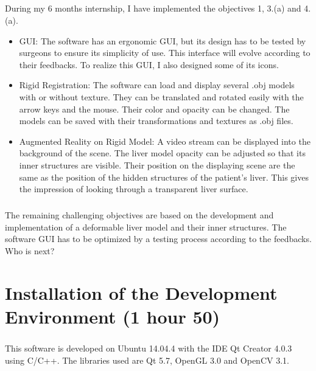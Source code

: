 \documentclass[12pt]{report}
\begin{document}
\paragraph{}
	During my 6 months internship, I have implemented the objectives 1, 3.(a) and 4.(a).\begin{itemize}
\item GUI: The software has an ergonomic GUI, but its design has to be tested by surgeons to ensure its simplicity of use. This interface will evolve according to their feedbacks. To realize this GUI, I also designed some of its icons.

\item Rigid Registration: The software can load and display several .obj models with or without texture. They can be translated and rotated easily with the arrow keys and the mouse. Their color and opacity can be changed. The models can be saved with their transformations and textures as .obj files.

\item Augmented Reality on Rigid Model: A video stream can be displayed into the background of the scene. The liver model opacity can be adjusted so that its inner structures are visible. Their position on the displaying scene are the same as the position of the hidden structures of the patient's liver. This gives the impression of looking through a transparent liver surface.
\end{itemize}

\paragraph{}
	The remaining challenging objectives are based on the development and implementation of a deformable liver model and their inner structures. The software GUI has to be optimized by a testing process according to the feedbacks. Who is next?


\chapter{Installation of the Development Environment (1 hour 50)} \label{sec:installation of the development environment} 


\paragraph{}
This software is developed on Ubuntu 14.04.4 with the IDE Qt Creator 4.0.3 using C/C++. The libraries used are Qt 5.7, OpenGL 3.0 and OpenCV 3.1.
\end{document}

